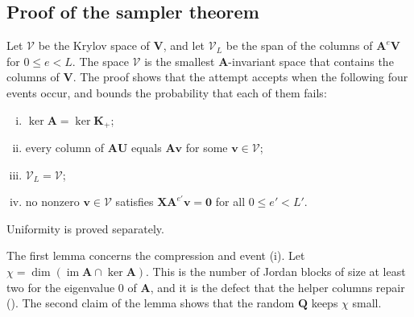 \documentclass[b5paper, 10pt, abstract=true, captions=tableheading]{scrartcl}
\theoremstyle{plain}
\theoremstyle{definition}
\renewcommand{\vec}[1]{\symbf{#1}}
\newcommand{\mat}[1]{\symbf{#1}}
\begin{document}
\subsection{Proof of the sampler theorem}
\label{subsec:wiedemann-proofs}
Let $\mathcal V$ be the Krylov space of $\mat V$, and let $\mathcal V_L$ be
the span of the columns of $\mat A^e\mat V$ for $0\leq e<L$. The space
$\mathcal V$ is the smallest $\mat A$-invariant space that contains the
columns of $\mat V$. The proof shows that the attempt accepts when the
following four events occur, and bounds the probability that each of them
fails:
\begin{enumerate}[(i)]
  \item $\ker\mat A=\ker\mat K_+$;
  \item every column of $\mat A\mat U$ equals $\mat A\vec v$ for some
  $\vec v\in\mathcal V$;
  \item $\mathcal V_L=\mathcal V$;
  \item no nonzero $\vec v\in\mathcal V$ satisfies
  $\mat X\mat A^{e'}\vec v=\vec 0$ for all $0\leq e'<L'$.
\end{enumerate}
Uniformity is proved separately.

The first lemma concerns the compression and event (i). Let
$\chi=\dim(\operatorname{im}\mat A\cap\ker\mat A)$. This is the number of
Jordan blocks of size at least two for the eigenvalue $0$ of $\mat A$, and
it is the defect that the helper columns repair
(). The second claim of the lemma shows
that the random $\mat Q$ keeps $\chi$ small.
\end{document}
